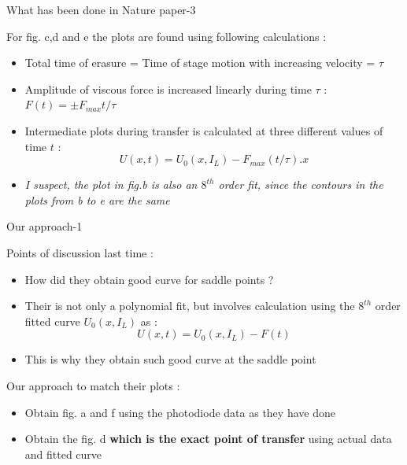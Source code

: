 \documentclass{beamer}
\begin{document}
\begin{frame}{What has been done in Nature paper-3} 

For fig. c,d and e the plots are found using following calculations :
\begin{itemize}

\item Total time of erasure = Time of stage motion with increasing velocity = $\tau$
\item Amplitude of viscous force is increased linearly during time $\tau$ : $F(t)=\pm F_{max}t/\tau$
\item Intermediate plots during transfer is calculated at three different values of time $t$ :
\begin{equation*}
U(x,t) = U_0(x,I_L)- F_{max}(t/\tau).x
\end{equation*}
\item \textit{I suspect, the plot in fig.b is also an $8^{th}$ order fit, since the contours in the plots from b to e are the same}

\end{itemize}

\end{frame}
\begin{frame}{Our approach-1} 

Points of discussion last time :
\begin{itemize}

\item How did they obtain good curve for saddle points ?
\item Their is not only a polynomial fit, but involves calculation using the $8^{th}$ order fitted curve $U_0(x,I_L)$ as :
\begin{equation*}
U(x,t) = U_0(x,I_L)- F(t)
\end{equation*}
\item This is why they obtain such good curve at the saddle point
\end{itemize}
Our approach to match their plots :
\begin{itemize}

\item Obtain fig. a and f using the photodiode data as they have done
\item Obtain the fig. d \textbf{which is the exact point of transfer} using actual data and fitted curve

\end{itemize}

\end{frame}
\end{document}
